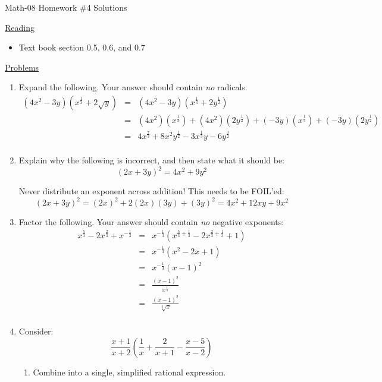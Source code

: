 \documentclass[letterpaper,12pt,fleqn]{article}
\begin{document}
\begin{center}
\Large Math-08 Homework \#4 Solutions
\end{center}

\vspace{0.5in}

\underline{Reading}

\begin{itemize}
\item Text book section 0.5, 0.6, and 0.7
\end{itemize}

\underline{Problems}

\begin{enumerate}
\item Expand the following. Your answer should contain \emph{no} radicals.
  \begin{eqnarray*}
    (4x^2-3y)(x^{\frac{1}{3}}+2\sqrt{y}) &=&
    (4x^2-3y)(x^{\frac{1}{3}}+2y^{\frac{1}{2}}) \\
    &=& (4x^2)(x^{\frac{1}{3}})+(4x^2)(2y^{\frac{1}{2}})+(-3y)(x^{\frac{1}{3}})+
    (-3y)(2y^{\frac{1}{2}}) \\
    &=& 4x^{\frac{7}{3}}+8x^2y^{\frac{1}{2}}-3x^{\frac{1}{3}}y-6y^{\frac{3}{2}} \\
  \end{eqnarray*}

\item Explain why the following is incorrect, and then state what it should
  be:
  \[(2x+3y)^2=4x^2+9y^2\]

  Never distribute an exponent across addition! This needs to be FOIL'ed:
  \[(2x+3y)^2=(2x)^2+2(2x)(3y)+(3y)^2=4x^2+12xy+9x^2\]

\item Factor the following. Your answer should contain \emph{no} negative
  exponents:
  \begin{eqnarray*}
    x^{\frac{5}{3}}-2x^{\frac{2}{3}}+x^{-\frac{1}{3}} &=&
    x^{-\frac{1}{3}}\left(x^{\frac{5}{3}+\frac{1}{3}}-2x^{\frac{2}{3}+\frac{1}{3}}+1\right) \\
    &=& x^{-\frac{1}{3}}(x^2-2x+1) \\
    &=& x^{-\frac{1}{3}}(x-1)^2 \\
    &=& \frac{(x-1)^2}{x^{\frac{1}{3}}} \\
    &=& \frac{(x-1)^2}{\sqrt[3]{x}} \\
  \end{eqnarray*}

\item Consider:
  \[\frac{x+1}{x+2}\left(\frac{1}{x}+\frac{2}{x+1}-\frac{x-5}{x-2}\right)\]
  \begin{enumerate}
  \item Combine into a single, simplified rational expression.


\end{enumerate}
\end{enumerate}
\end{document}
